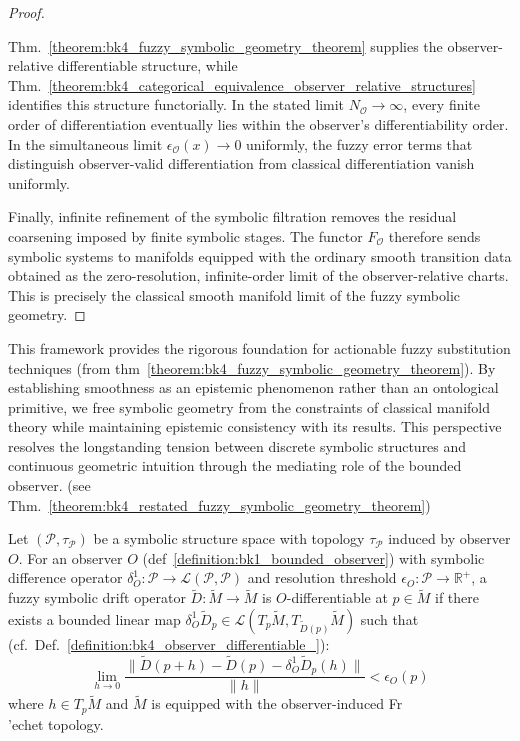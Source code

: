 \begin{proof}
\label{proof:bk4_emergence_of_classical_ge}
\leavevmode

Thm.~\ref{theorem:bk4_fuzzy_symbolic_geometry_theorem} supplies the
observer-relative differentiable structure, while
Thm.~\ref{theorem:bk4_categorical_equivalence_observer_relative_structures}
identifies this structure functorially. In the stated limit
$N_{\mathcal O}\to\infty$, every finite order of differentiation eventually lies
within the observer's differentiability order. In the simultaneous limit
$\epsilon_{\mathcal O}(x)\to0$ uniformly, the fuzzy error terms that distinguish
observer-valid differentiation from classical differentiation vanish uniformly.

Finally, infinite refinement of the symbolic filtration removes the residual
coarsening imposed by finite symbolic stages. The functor
$F_{\mathcal O}$ therefore sends symbolic systems to manifolds equipped with the
ordinary smooth transition data obtained as the zero-resolution, infinite-order
limit of the observer-relative charts. This is precisely the classical smooth
manifold limit of the fuzzy symbolic geometry.
\end{proof}
\begin{remark}
\label{remark:bk4_fuzzy_notation}
This framework provides the rigorous foundation for actionable fuzzy substitution techniques (from thm~\ref{theorem:bk4_fuzzy_symbolic_geometry_theorem}). By establishing smoothness as an epistemic phenomenon rather than an ontological primitive, we free symbolic geometry from the constraints of classical manifold theory while maintaining epistemic consistency with its results. This perspective resolves the longstanding tension between discrete symbolic structures and continuous geometric intuition through the mediating role of the bounded observer. (see Thm.~\ref{theorem:bk4_restated_fuzzy_symbolic_geometry_theorem})
\end{remark}
\begin{definition} \label{definition:bk4_observer_valid_different}

Let $(\mathcal{P}, \tau_{\mathcal{P}})$ be a symbolic structure space with topology $\tau_{\mathcal{P}}$ induced by observer $O$.
For an observer $O$ (def~\ref{definition:bk1_bounded_observer}) with symbolic difference operator $\delta^1_O: \mathcal{P} \to \mathcal{L}(\mathcal{P}, \mathcal{P})$ and resolution threshold $\epsilon_O: \mathcal{P} \to \mathbb{R}^+$, a fuzzy symbolic drift operator $\widetilde{D}: \widetilde{M} \to \widetilde{M}$ is $O$-differentiable at $p \in \widetilde{M}$ if there exists a bounded linear map $\delta^1_O \widetilde{D}_p \in \mathcal{L}(T_p\widetilde{M}, T_{\widetilde{D}(p)}\widetilde{M})$ such that (cf.~Def.~\ref{definition:bk4_observer_differentiable_}):
\[
\lim_{h \to 0} \frac{\|\widetilde{D}(p+h) - \widetilde{D}(p) - \delta^1_O \widetilde{D}_p(h)\|}{\|h\|} < \epsilon_O(p)
\]
where $h \in T_p\widetilde{M}$ and $\widetilde{M}$ is equipped with the observer-induced Fr\\'echet topology.
\end{definition}
